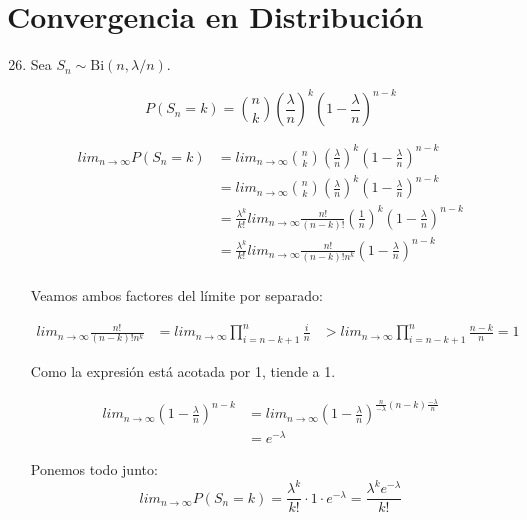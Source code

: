 \section{Convergencia en Distribución}
\begin{enumerate}
	\setcounter{enumi}{25}
	\item
		Sea $S_n \sim \text{Bi}(n,\lambda /n)$.
		
		$$P(S_n = k) = \binom{n}{k} \left( \frac{\lambda}{n}\right) ^k \left(1- \frac{\lambda}{n}\right) ^{n-k}$$
		
		\begin{align*}
			lim_{n\rightarrow \infty} P(S_n = k) & = lim_{n\rightarrow \infty} \binom{n}{k} \left( \frac{\lambda}{n}\right) ^k \left(1- \frac{\lambda}{n}\right) ^{n-k} \\
			                                     & = lim_{n\rightarrow \infty} \binom{n}{k} \left( \frac{\lambda}{n}\right) ^k \left(1- \frac{\lambda}{n}\right) ^{n-k} \\
			                                     & = \frac{\lambda^k}{k!} lim_{n\rightarrow \infty} \frac{n!}{(n-k)!} \left( \frac{1}{n}\right) ^k \left(1- \frac{\lambda}{n}\right) ^{n-k} \\
			                                     & = \frac{\lambda^k}{k!} lim_{n\rightarrow \infty} \frac{n!}{(n-k)!n^k} \left(1- \frac{\lambda}{n}\right) ^{n-k} \\
		\end{align*}
		
		Veamos ambos factores del límite por separado:
		
		\begin{align*}
			lim_{n\rightarrow \infty} \frac{n!}{(n-k)!n^k} & = lim_{n\rightarrow \infty} \prod_{i=n-k+1}^n \frac{i}{n}
			                                               & > lim_{n\rightarrow \infty} \prod_{i=n-k+1}^n \frac{n-k}{n} = 1
		\end{align*}
		
		Como la expresión está acotada por 1, tiende a 1.
		
		\begin{align*}
			lim_{n\rightarrow \infty} \left(1- \frac{\lambda}{n}\right) ^{n-k} & = lim_{n\rightarrow \infty} \left(1- \frac{\lambda}{n}\right) ^{\frac{n}{-\lambda}(n-k)\frac{-\lambda}{n}} \\
			                                                                   & = e^{-\lambda}
		\end{align*}
		
		Ponemos todo junto:
		$$lim_{n\rightarrow \infty} P(S_n = k) = \frac{\lambda^k}{k!} \cdot 1 \cdot e^{-\lambda} = \frac{\lambda^k e^{-\lambda}}{k!}$$
		

\end{enumerate}
